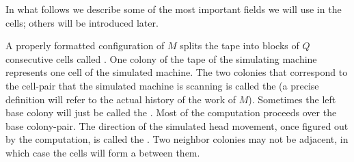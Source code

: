 \documentclass[11pt]{memoir}
\theoremstyle{definition} %
\newcommand{\fld}[1]{\ensuremath{\textit{#1\/}}}
\newcommand{\Q}{Q} %
\newcommand{\Hold}{\fld{Hold}}
\begin{document}

In what follows we describe some of the most important fields we will use in the cells;
others will be introduced later.

A properly formatted configuration of \( M \) splits the tape into blocks of \( \Q \)
consecutive cells called .
One colony of the tape of the simulating
machine represents one cell of the simulated machine.
The two colonies that correspond to the cell-pair that the
simulated machine is scanning is called the 
(a precise definition will refer to the actual history of the work of \( M \)).
Sometimes the left base colony will just be called the .
Most of the computation proceeds over the base colony-pair.
The direction of the simulated head movement, once figured out by the computation,
is called the .
Two neighbor colonies may not be adjacent, in which case the cells will form
a  between them.
\end{document}
